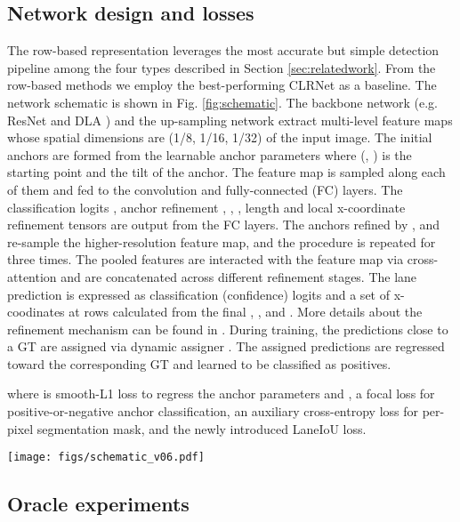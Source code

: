 \documentclass[10pt,twocolumn,letterpaper]{article}
\begin{document}
\subsection{Network design and losses}
The row-based representation \cite{Zheng_2022_CVPR, Liu_2021_ICCV, tabelini2021cvpr} leverages the most accurate but simple detection pipeline among the four types described in Section \ref{sec:relatedwork}. From the row-based methods we employ the best-performing CLRNet \cite{Zheng_2022_CVPR} as a baseline. 
The network schematic is shown in Fig. \ref{fig:schematic}.
The backbone network (e.g. ResNet \cite{He_2016_CVPR} and DLA \cite{Yu_2018_CVPR}) and the up-sampling network extract multi-level feature maps whose spatial dimensions are (1/8, 1/16, 1/32) of the input image.
The initial anchors are formed from the  learnable anchor parameters  where (, ) is the starting point and  the tilt of the anchor.
The feature map is sampled along each of them and fed to the convolution and fully-connected (FC) layers.
The classification logits , anchor refinement , , , length  and local x-coordinate refinement  tensors are output from the FC layers. 
The anchors refined by ,  and  re-sample the higher-resolution feature map, and the procedure is repeated for three times.
The pooled features are interacted with the feature map via cross-attention and are concatenated across different refinement stages.
The lane prediction is expressed as classification (confidence) logits and a set of x-coodinates at  rows calculated from the final ,  ,  and .
More details about the refinement mechanism can be found in \cite{Zheng_2022_CVPR}.
During training, the predictions close to a GT are assigned via dynamic assigner \cite{YOLOX}.
The assigned predictions are regressed toward the corresponding GT and learned to be classified as positives. 

where  is smooth-L1 loss to regress the anchor parameters  and ,  a focal loss \cite{focalloss} for positive-or-negative anchor classification,  an auxiliary cross-entropy loss for per-pixel segmentation mask, and   the newly introduced LaneIoU loss. 

\begin{figure*}[t]
\begin{center}
    \texttt{[image: figs/schematic\_v06.pdf]}
\end{center}
   \caption{Network Schematic of CLRerNet.}
\label{fig:long}
\label{fig:schematic}
\end{figure*}


\subsection{Oracle experiments}\label{subsection:oracle}
\end{document}
